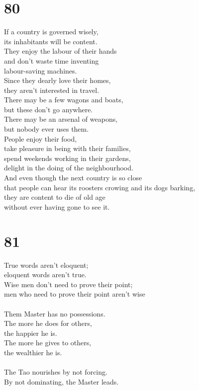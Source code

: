 \documentclass[b5paper, 12pt, oneside]{book}
\begin{document}
\chapter*{80}
If a country is governed wisely,\\
its inhabitants will be content.\\
They enjoy the labour of their hands\\
and don't waste time inventing\\
labour-saving machines.\\
Since they dearly love their homes,\\
they aren't interested in travel.\\
There may be a few wagons and boats,\\
but these don't go anywhere.\\
There may be an arsenal of weapons,\\
but nobody ever uses them.\\
People enjoy their food,\\
take pleasure in being with their families,\\
spend weekends working in their gardens,\\
delight in the doing of the neighbourhood.\\
And even though the next country is so close\\
that people can hear its roosters crowing and its dogs barking,\\
they are content to die of old age\\
without ever having gone to see it.

\chapter*{81}
True words aren't eloquent;\\
eloquent words aren't true.\\
Wise men don't need to prove their point;\\
men who need to prove their point aren't wise\\
\\
Them Master has no possessions.\\
The more he does for others,\\
the happier he is.\\
The more he gives to others,\\
the wealthier he is.\\
\\
The Tao nourishes by not forcing.\\
By not dominating, the Master leads.
\end{document}
